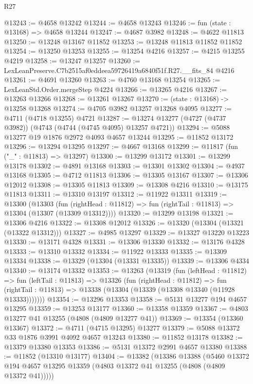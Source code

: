 \begin{lexlean}{R27}
\begin{coremodule}
@13243 := @4658 @13242
@13244 := @4658 @13243
@13246 := fun (state : @13168) => @4658 @13244
@13247 := @4687 @3982
@13248 := @4622 @11813
@13250 := @13248 @13167 @11852
@13253 := @13248 @11813 @11852 @11852
@13254 := @13250 @13253
@13255 := @13254 @4216
@13257 := @4215 @13255 @4219
@13258 := @13247 @13257
@13260 := LexLeanPreserve.C7b2515af0eddeea59726419a6840f51f.R27.__fits_84 @4216
@13261 := @4691 @13260
@13263 := @4760 @13168 @13254
@13265 := LexLeanStd.Order.mergeStep @4224
@13266 := @13265 @4216
@13267 := @13263 @13266
@13268 := @13261 @13267
@13270 := (state : @13168) -> @13258 @13268
@13274 := @4705 @3982 @13257 @13268 @4095
@13277 := @4711 (@4718 @13255) @4721
@13287 := @13274 @13277 (@4727 (@4737 @3982)) (@4743 (@4744 (@4745 @4095) @13257 @4721))
@13294 := @5088 @13277 @19 @1876 @2972 @4093 @4657 @13244
@13295 := @11852 @13172
@13296 := @13294 @13295
@13297 := @4667 @13168
@13299 := @11817 (fun ("_" : @11813) => @13297)
@13300 := @13299 @13172
@13301 := @13299 @13178
@13302 := @4891 @13168
@13303 := @13301 @13302
@13304 := @4937 @13168
@13305 := @4712 @11813
@13306 := @13305 @13167
@13307 := @13306 @12012
@13308 := @13305 @11813
@13309 := @13308 @4216
@13310 := @13175 @11813
@13311 := @13310 @13197
@13312 := @11922 @13311
@13319 := @13300
    (@13303
      (fun (rightHead : @11812) => fun (rightTail : @11813) => @13304 (@13307 (@13309 @13312))))
@13320 := @13299 @13198
@13321 := @13306 @4216
@13322 := @13308 @12012
@13326 := @13320 (@13304 (@13321 (@13322 @13312)))
@13327 := @4985 @13297
@13329 := @13327 @13220 @13223
@13330 := @13171 @4328
@13331 := @13306 @13330
@13332 := @13176 @4328
@13333 := @13310 @13332
@13334 := @11922 @13333
@13335 := @13309 @13334
@13338 := @13329 (@13304 (@13331 @13335))
@13339 := @13306 @4334
@13340 := @13174 @13332
@13353 := @13263
    (@13319
      (fun (leftHead : @11812) =>
      fun (leftTail : @11813) =>
      @13326
        (fun (rightHead : @11812) =>
        fun (rightTail : @11813) => @13338 (@13304 (@13339 (@13308 @13340 (@11928 @13333)))))))
@13354 := @13296 @13353
@13358 := @5131 @13277 @194 @4657 @13295
@13359 := @13253 @13177
@13360 := @13358 @13359
@13367 := @4803 @13277 @41 @13255 (@4808 (@4809 @13277 @41))
@13369 := @13354 (@13360 @13367)
@13372 := @4711 (@4715 @13295) @13277
@13379 := @5088 @13372 @33 @1876 @3991 @4092 @4657 @13243
@13380 := @11852 @13178
@13382 := @13379 @13380 @13353
@13386 := @5131 @13372 @2991 @4657 @13380
@13388 := @11852 (@13310 @13177)
@13404 := @13382
    (@13386
      @13388
      (@5460 @13372 @194 @4657 @13295 @13359 (@4803 @13372 @41 @13255 (@4808 (@4809 @13372 @41)))))

\end{coremodule}
\end{lexlean}

